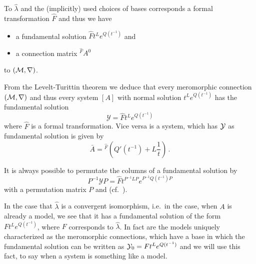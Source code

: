 To $\hat\lambda$ and the (implicitly) used choices of bases corresponds a
formal transformation $\hat F$ and thus we have
\begin{itemize}
  \item a fundamental solution $\hat Ft^L e^{Q(t^{-1})}$ and
  \item a connection matrix ${}^{\hat F}\!A^0$
\end{itemize}
to $(\mathcal{M},\nabla)$.
\begin{cor}
  From the Levelt-Turittin theorem we deduce that every meromorphic connection
  $(\mathcal{M},\nabla)$ and thus every system $[A]$ with normal solution
  $t^L e^{Q(t^{-1})}$ has the fundamental solution
  \[
    \mathcal{Y}=\hat F t^L e^{Q(t^{-1})}
  \]
  where $\hat F$ is a formal transformation.
  Vice versa is a system, which has $\mathcal{Y}$ as fundamental solution is given by
  \[
    \bar A={}^{\hat F}\left(Q'(t^{-1})+L\frac{1}{t}\right) \,.
  \]
  \begin{s-rem}
    It is always possible to permutate the columns of a fundamental solution by
    \[
      P^{-1}\mathcal{Y}P=\hat F t^{P^{-1}LP} e^{P^{-1}Q(t^{-1})P}
    \]
    with a permutation matrix $P$ and  (cf.\ \cite[73]{Loday2014}).
  \end{s-rem}
\end{cor}
In the case that $\hat\lambda$ is a convergent isomorphism, i.e.\ in the case,
when $A$ is already a model, we see that it has a fundamental solution of the
form $Ft^L e^{Q(t^{-1})}$, where $F$ corresponds to $\hat\lambda$.
In fact are the models uniquely characterized as the meromorphic connections,
which have a base in which the fundamental solution can be written as
$\mathcal{Y}_0=Ft^Le^{Q(t^{-1})}$ and we will use this fact, to say when a system is
something like a model.
